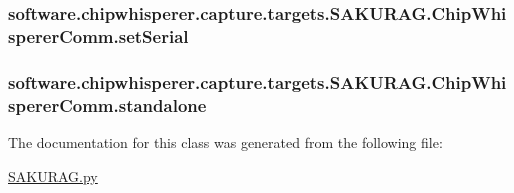 \subsubsection[{set\+Serial}]{\setlength{\rightskip}{0pt plus 5cm}software.\+chipwhisperer.\+capture.\+targets.\+S\+A\+K\+U\+R\+A\+G.\+Chip\+Whisperer\+Comm.\+set\+Serial}\label{classsoftware_1_1chipwhisperer_1_1capture_1_1targets_1_1SAKURAG_1_1ChipWhispererComm_a75c4e8865a7859de1be9132fafc1ae6c}
\hypertarget{classsoftware_1_1chipwhisperer_1_1capture_1_1targets_1_1SAKURAG_1_1ChipWhispererComm_a7027dac3728fcdd9cccbee5e5f416731}{}
\subsubsection[{standalone}]{\setlength{\rightskip}{0pt plus 5cm}software.\+chipwhisperer.\+capture.\+targets.\+S\+A\+K\+U\+R\+A\+G.\+Chip\+Whisperer\+Comm.\+standalone}\label{classsoftware_1_1chipwhisperer_1_1capture_1_1targets_1_1SAKURAG_1_1ChipWhispererComm_a7027dac3728fcdd9cccbee5e5f416731}


The documentation for this class was generated from the following file\+:\begin{DoxyCompactItemize}
\item 
\hyperlink{SAKURAG_8py}{S\+A\+K\+U\+R\+A\+G.\+py}\end{DoxyCompactItemize}

